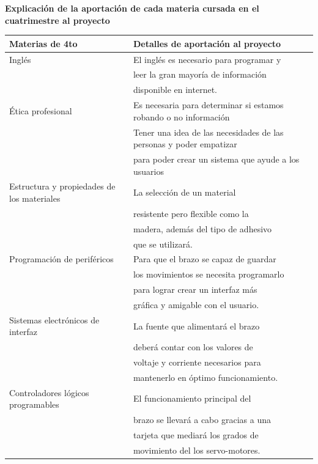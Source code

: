 \documentclass[letterpaper]{article}
\begin{document}
\begin{large}
\textbf{Explicación de la aportación  de cada materia cursada en el cuatrimestre al proyecto}


\begin{table}[htbp]
    \centering
   
   
    \begin{tabular}{|l|l|}
    \hline
Materias de 4to  &  Detalles de aportación al proyecto 
                        \\ \hline
Inglés & El inglés es necesario para programar y\\
        & leer la gran mayoría de información\\
        & disponible en internet.
                        \\ \hline
Ética profesional &  Es necesaria para determinar si estamos robando o no información\\
                  &  Tener una idea de las necesidades de las personas y poder empatizar\\
                  &  para poder crear un sistema que ayude a los usuarios
                  
                        \\\hline
Estructura y propiedades de los materiales & La selección de un material\\
                                 & resistente pero flexible como la\\
                                 & madera, además del tipo de adhesivo\\
                                 & que se utilizará.
                        \\\hline
Programación de periféricos & Para que el brazo se capaz de guardar\\
                            & los movimientos se necesita programarlo\\
                            & para lograr crear un interfaz más\\
                            & gráfica y amigable con el usuario.
                        \\\hline
Sistemas electrónicos de interfaz & La fuente que alimentará el brazo\\
                                 & deberá contar con los valores de\\
                                 & voltaje y corriente necesarios para\\
                                 & mantenerlo en óptimo funcionamiento.
                        \\\hline
Controladores lógicos programables & El funcionamiento principal del\\
                                &brazo se llevará a cabo gracias a una\\
                                & tarjeta que mediará los grados de\\
                                & movimiento del los servo-motores.\\
                                \hline
        

\end{tabular}
\end{table}
\end{large}
\end{document}
